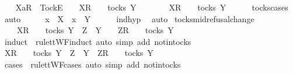 \ \ \isamarkupfalse%
\ {\isachardoublequoteopen}{\isacharbrackleft}Xa{\isacharbrackright}\isactrlsub R\ {\isacharhash}\ {\isacharbrackleft}Tock{\isacharbrackright}\isactrlsub E\ {\isacharhash}\ {\isasymsigma}{\isacharprime}\ {\isacharat}\ {\isacharbrackleft}X{\isacharbrackright}\isactrlsub R\ {\isacharhash}\ {\isasymsigma}\ {\isasymin}\ tocks\ Y{\isachardoublequoteclose}\isanewline
\ \ \isamarkupfalse%
\ \isamarkupfalse%
\ {\isachardoublequoteopen}{\isasymsigma}{\isacharprime}\ {\isacharat}\ {\isacharbrackleft}X{\isacharbrackright}\isactrlsub R\ {\isacharhash}\ {\isasymsigma}\ {\isasymin}\ tocks\ Y{\isachardoublequoteclose}\isanewline
\ \ \ \ \isamarkupfalse%
\ tocks{\isachardot}cases\ \isamarkupfalse%
\ auto\isanewline
\ \ \isamarkupfalse%
\ \isamarkupfalse%
\ {\isachardoublequoteopen}x\ {\isasymin}\ X\ {\isasymLongrightarrow}\ x\ {\isasymin}\ Y{\isachardoublequoteclose}\isanewline
\ \ \ \ \isamarkupfalse%
\ ind{\isacharunderscore}hyp\ \isamarkupfalse%
\ auto\isanewline
{}\isamarkupfalse%
%
\endisatagproof
{\isafoldproof}%
%
\isadelimproof
\isanewline
%
\endisadelimproof
\isanewline
{}\isamarkupfalse%
\ tocks{\isacharunderscore}mid{\isacharunderscore}refusal{\isacharunderscore}change{\isacharcolon}\isanewline
\ \ {\isachardoublequoteopen}{\isasymrho}\ {\isacharat}\ {\isacharbrackleft}X{\isacharbrackright}\isactrlsub R\ {\isacharhash}\ {\isasymsigma}\ {\isasymin}\ tocks\ Y\ {\isasymLongrightarrow}\ Z\ {\isasymsubseteq}\ Y\ {\isasymLongrightarrow}\ {\isasymrho}\ {\isacharat}\ {\isacharbrackleft}Z{\isacharbrackright}\isactrlsub R\ {\isacharhash}\ {\isasymsigma}\ {\isasymin}\ tocks\ Y{\isachardoublequoteclose}\isanewline
%
\isadelimproof
%
\endisadelimproof
%
\isatagproof
{}\isamarkupfalse%
\ {\isacharparenleft}induct\ {\isasymrho}\ rule{\isacharcolon}ttWF{\isachardot}induct{\isacharcomma}\ auto\ simp\ add{\isacharcolon}\ notin{\isacharunderscore}tocks{\isacharparenright}\isanewline
\ \ \isamarkupfalse%
\ {\isachardoublequoteopen}{\isacharbrackleft}X{\isacharbrackright}\isactrlsub R\ {\isacharhash}\ {\isasymsigma}\ {\isasymin}\ tocks\ Y\ {\isasymLongrightarrow}\ Z\ {\isasymsubseteq}\ Y\ {\isasymLongrightarrow}\ {\isacharbrackleft}Z{\isacharbrackright}\isactrlsub R\ {\isacharhash}\ {\isasymsigma}\ {\isasymin}\ tocks\ Y{\isachardoublequoteclose}\isanewline
\ \ \isamarkupfalse%
\ {\isacharparenleft}cases\ {\isasymsigma}\ rule{\isacharcolon}ttWF{\isachardot}cases{\isacharcomma}\ auto\ simp\ add{\isacharcolon}\ notin{\isacharunderscore}tocks{\isacharparenright}\isanewline
